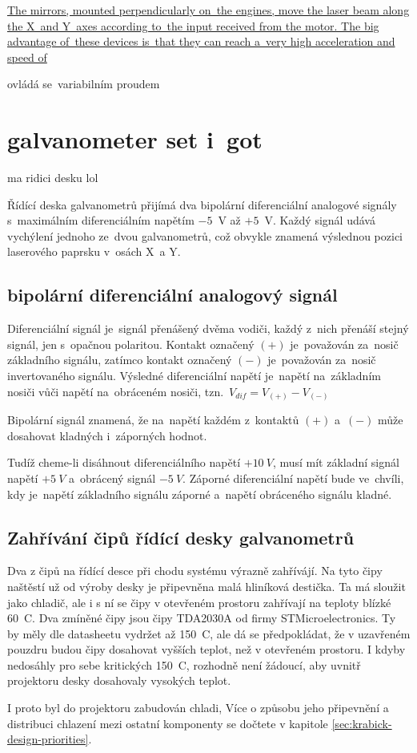 \href{https://elenlaser.com/blog/galvo-head-laser-focus-tool.html}{The mirrors, mounted perpendicularly on~the engines, move the laser beam along the X~and Y~axes according to~the input received from the motor.
The big advantage of~these devices is~that they can reach a~very high acceleration and speed of}

ovládá se~variabilním proudem

\section{galvanometer set i~got} \label{sec:my-galvos}

ma ridici desku lol

Řídící deska galvanometrů přijímá dva bipolární diferenciální analogové signály s~maximálním diferenciálním napětím $-5$~V až $+5$~V. Každý signál udává vychýlení jednoho ze~dvou galvanometrů, což obvykle znamená výslednou pozici laserového paprsku v~osách X~a Y.

\subsection{bipolární diferenciální analogový signál~\cite{ilda-signal-spec}}
Diferenciální signál je~signál přenášený dvěma vodiči, každý z~nich přenáší stejný signál, jen s~opačnou polaritou. Kontakt označený $(+)$ je~považován za~nosič základního signálu, zatímco kontakt označený $(-)$ je~považován za~nosič invertovaného signálu. Výsledné diferenciální napětí je~napětí na~základním nosiči vůči napětí na~obráceném nosiči, tzn.~$V_{dif} = V_{(+)} - V_{(-)}$

Bipolární signál znamená, že na~napětí každém z~kontaktů $(+)$ a~$(-)$ může dosahovat kladných i~záporných hodnot.

Tudíž cheme-li disáhnout diferenciálního napětí $+10~V$, musí mít základní signál napětí $+5~V$ a~obrácený signál $-5~V$. Záporné diferenciální napětí bude ve~chvíli, kdy je~napětí základního signálu záporné a~napětí obráceného signálu kladné.

\subsection{Zahřívání čipů řídící desky galvanometrů} \label{sec:galvoboard-chips-heating-up}
Dva z čipů na řídící desce při chodu systému výrazně zahřívájí. Na tyto čipy naštěstí už od výroby desky je připevněna malá hliníková destička. Ta má sloužit jako chladič, ale i s ní se čipy v otevřeném prostoru zahřívají na teploty blízké 60~\degree{}C.
Dva zmíněné čipy jsou čipy TDA2030A od firmy STMicroelectronics. Ty by měly dle datasheetu vydržet až 150~\degree{}C, ale dá se předpokládat, že v uzavřeném pouzdru budou čipy dosahovat vyšších teplot, než v otevřeném prostoru. I kdyby nedosáhly pro sebe kritických 150~\degree{}C, rozhodně není žádoucí, aby uvnitř projektoru desky dosahovaly vysokých teplot.

I proto byl do projektoru zabudován chladi, Více o způsobu jeho připevnění a distribuci chlazení mezi ostatní komponenty se dočtete v kapitole \ref{sec:krabick-design-priorities}.
